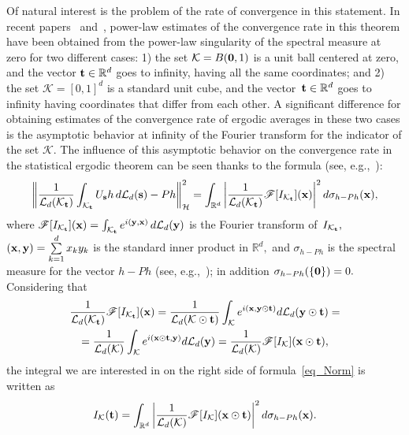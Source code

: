 \documentclass[12pt]{article}
\begin{document}
Of natural interest is the problem of the rate of convergence in this statement. In recent papers~\cite{Po23} and~\cite{KPTKh24, Po24}, power-law estimates of the convergence rate in this theorem have been obtained from the power-law singularity of the spectral measure at zero for two different cases: 1) the set ${\mathcal{K}=B({\bf0},1)}$ is a unit ball centered at zero, and the vector ${{\bf t}\in\mathbb{R}^d}$ goes to infinity, having all the same coordinates; and 2) the set ${\mathcal{K}=[0,1]^d}$ is a standard unit cube, and the vector~${{\bf t}\in\mathbb{R}^d}$ goes to infinity having coordinates that differ from each other. A significant difference for obtaining estimates of the convergence rate of ergodic averages in these two cases is the asymptotic behavior at infinity of the Fourier transform for the indicator of the set $\mathcal{K}$. The influence of this asymptotic behavior on the convergence rate in the statistical ergodic theorem can be seen thanks to the formula (see, e.g.,~\cite{BE74}):
\begin{equation}\label{eq_Norm}
\left\|\frac{1}{\mathcal{L}_d(\mathcal{K}_{\bf t})}\int_{\mathcal{K}_{\bf t}}U_{\bf s}h\,d\mathcal{L}_d({\bf s})-Ph\right\|^2_{\mathcal{H}}=\int_{\mathbb{R}^d}\left|\frac{1}{\mathcal{L}_d(\mathcal{K}_{\bf t})}\mathscr{F}[I_{\mathcal{K}_{\bf t}}]({\bf x})\right|^2d\sigma_{h-Ph}(\bf x),
\end{equation}
where ${\mathscr{F}[I_{\mathcal{K}_{\bf t}}]({\bf x})=\int_{{\mathcal{K}_{\bf t}}}e^{i({\bf y},{\bf x})}\,d\mathcal{L}_d(\bf y)}$ is the Fourier transform of~${I_{\mathcal{K}_{\bf t}}},$ ${({\bf x},{\bf y})=\sum\limits_{k=1}^dx_ky_k}$ is the standard inner product in $\mathbb{R}^d,$ and $\sigma_{h-Ph}$ is the spectral measure for the vector $h-Ph$ (see, e.g.,~\cite{F95}); in addition ${\sigma_{h-Ph}(\{{\bf 0}\})=0}.$ Considering that
\begin{multline*}
\frac{1}{\mathcal{L}_d(\mathcal{K}_{\bf t})}\mathscr{F}[I_{\mathcal{K}_{\bf t}}]({\bf x})=\frac{1}{\mathcal{L}_d(\mathcal{K}\odot{\bf t})}\int_{\mathcal{K}}e^{i({\bf x},{\bf y}\odot{\bf t})}d\mathcal{L}_d({\bf y}\odot{\bf t})=\\
=\frac{1}{\mathcal{L}_d(\mathcal{K})}\int_{\mathcal{K}}e^{i({\bf x}\odot{\bf t},{\bf y})}d\mathcal{L}_d({\bf y})=\frac{1}{\mathcal{L}_d(\mathcal{K})}\mathscr{F}[I_{\mathcal{K}}]({\bf x}\odot{\bf t}),
\end{multline*}
the integral we are interested in on the right side of formula~\eqref{eq_Norm} is written as
\begin{equation}\label{eq_StudInegral}
I_{\mathcal{K}}({\bf t})=\int_{\mathbb{R}^d}\left|\frac{1}{\mathcal{L}_d(\mathcal{K})}\mathscr{F}[I_{\mathcal{K}}]({\bf x}\odot{\bf t})\right|^2d\sigma_{h-Ph}(\bf x).
\end{equation}
\end{document}
